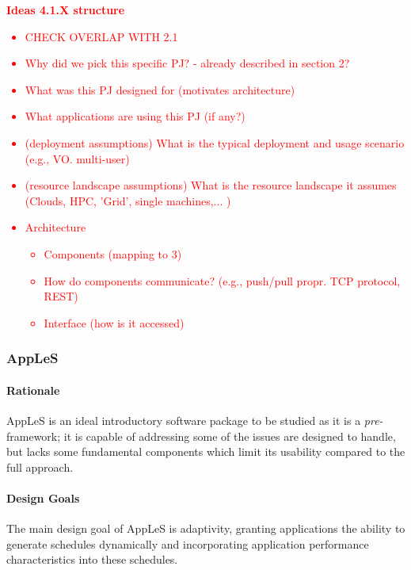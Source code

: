 \documentclass{sig-alternate}
\begin{document}
\textcolor{red}
{
\textbf{Ideas 4.1.X structure}
\begin{itemize}
\item CHECK OVERLAP WITH 2.1
\item Why did we pick this specific PJ? - already described in section 2?
\item What was this PJ designed for (motivates architecture)
\item What applications are using this PJ (if any?)
\item (deployment assumptions) What is the typical deployment and usage scenario (e.g., VO. multi-user)
\item (resource landscape assumptions) What is the resource landscape it assumes (Clouds, HPC, 'Grid', single machines,... )
\item Architecture
  \begin{itemize}
    \item Components (mapping to 3)
    \item How do components communicate? (e.g., push/pull propr. TCP protocol, REST)
    \item Interface (how is it accessed)
  \end{itemize}
\end{itemize}
}


%
\subsubsection{AppLeS}
\paragraph{Rationale}
AppLeS is an ideal introductory software package to be studied
as it is a \textit{pre-\pilot} framework; it is capable of
addressing some of the issues \pilotjobs are designed to handle,
but lacks some fundamental components which limit its usability
compared to the full \pilotjob approach.

\paragraph{Design Goals}
The main design goal of AppLeS is adaptivity, granting applications
the ability to generate schedules dynamically and incorporating
application performance characteristics into these schedules.
\end{document}
